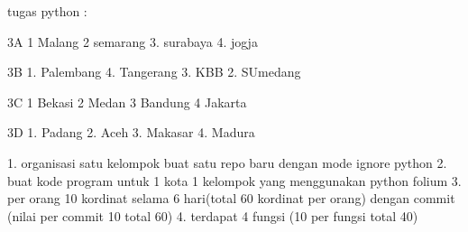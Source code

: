 tugas python :

3A
1 Malang
2 semarang
3. surabaya
4. jogja

3B 
1. Palembang
4. Tangerang
3. KBB
2. SUmedang

3C
1 Bekasi
2 Medan
3 Bandung
4 Jakarta



3D
1. Padang
2. Aceh
3. Makasar
4. Madura




1. organisasi satu kelompok buat satu repo baru dengan mode ignore python
2. buat kode program untuk 1 kota 1 kelompok yang menggunakan python folium
3. per orang 10 kordinat selama 6 hari(total 60 kordinat per orang) dengan commit (nilai per commit 10 total 60)
4. terdapat 4 fungsi (10 per fungsi total 40)

